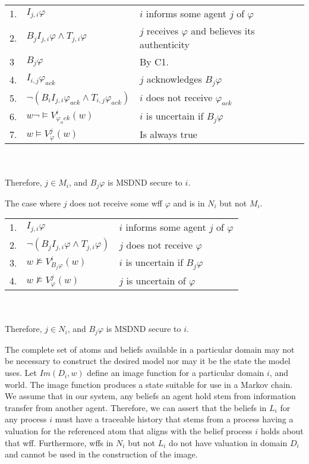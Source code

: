 \begin{table}[h!]
\centering
\small
\begin{tabularx}{\linewidth}{l l X}
1. & $I_{j,i} \varphi$ & $i$ informs some agent $j$ of $\varphi$ \\
2. & $B_{j}I_{j,i} \varphi \wedge T_{j,i} \varphi$ & $j$ receives $\varphi$ and believes its authenticity \\
3  & $B_j \varphi$ & By C1. \\
4. & $I_{i,j} \varphi_{ack}$ & $j$ acknowledges $B_j \varphi$ \\
5. & $\neg(B_{i}I_{j,i} \varphi_{ack} \wedge T_{i,j} \varphi_{ack})$ & $i$ does not receive $\varphi_{ack}$ \\
6. & $w \neg \vDash V_{\varphi_ack}^{i}(w)$ & $i$ is uncertain if $B_j \varphi$ \\
7. & $w \vDash V_{\varphi}^{j}(w)$ & Is always true %
\end{tabularx} \\~\\
Therefore, $j \in M_i$, and $B_j \varphi$ is MSDND secure to $i$.
\label{tab:msetsecurity}
\end{table}

\begin{case}
The case where $j$ does not receive some wff $\varphi$ and is in $N_i$ but not $M_i$.
\end{case}

\begin{table}[h!]
\centering
\small
\begin{tabularx}{\linewidth}{l l X}
1. & $I_{j,i} \varphi$ & $i$ informs some agent $j$ of $\varphi$ \\
2. & $\neg(B_{j}I_{j,i} \varphi \wedge T_{j,i} \varphi)$ & $j$ does not receive $\varphi$ \\
3. & $w \not \vDash V_{B_j \varphi}^{i}(w)$ & $i$ is uncertain if $B_j \varphi$ \\
4. & $w \not \vDash V_{\varphi}^{j}(w)$ & $j$ is uncertain of $\varphi$ %
\end{tabularx} \\~\\
Therefore, $j \in N_i$, and $B_j \varphi$ is MSDND secure to $i$.
\label{tab:nsetsecurity}
\end{table}


The complete set of atoms and beliefs available in a particular domain may not be necessary to construct the desired model nor may it be the state the model uses. Let $Im(D_i, w)$ define an image function for a particular domain $i$, and world. The image function produces a state suitable for use in a Markov chain. We assume that in our system, any beliefs an agent hold stem from information transfer from another agent. Therefore, we can assert that the beliefs in $L_i$ for any process $i$ must have a traceable history that stems from a process having a valuation for the referenced atom that aligns with the belief process $i$ holds about that wff. Furthermore, wffs in $N_i$ but not $L_i$ do not have valuation in domain $D_i$ and cannot be used in the construction of the image.

